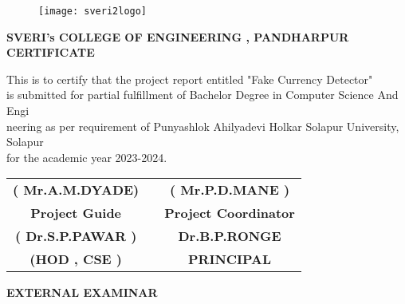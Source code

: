 \documentclass[12pt]{article}
\begin{document}
\clearpage


\begin{figure}[h]
 \centering
 \texttt{[image: sveri2logo]}
\end{figure}

\begin{center}
 \large \textbf { SVERI's COLLEGE OF ENGINEERING , PANDHARPUR }\\[7mm]
 \textbf{CERTIFICATE}\\[7mm]
 \end{center} 
 This is to certify that the project report entitled "Fake Currency Detector"\\[2mm] is submitted for partial fulfillment of Bachelor Degree in Computer Science And Engi\\[2mm]neering as per requirement of Punyashlok Ahilyadevi Holkar Solapur University, Solapur\\[2mm] for the academic year 2023-2024.\\[30mm] 
 

 
 \begin{tabular}{ c c c } 
 \textbf{( Mr.A.M.DYADE)} & \hspace{2.0in} & \textbf{( Mr.P.D.MANE )} \\ [1mm] 
 \textbf {Project Guide} & \hspace{2.0in} & \textbf{Project Coordinator}\\[30mm]
 \textbf{( Dr.S.P.PAWAR )} & \hspace{2.0in}  & \textbf{Dr.B.P.RONGE}\\[1mm]
 \textbf{(HOD , CSE )} & \hspace{2.0in}  & \textbf{ PRINCIPAL }\\[30mm]
 \end{tabular}
 
 \begin{center}
 \large \textbf { EXTERNAL EXAMINAR }
 \end{center} 


\clearpage
\end{document}
